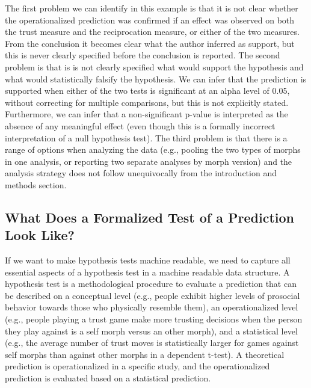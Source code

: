\documentclass[doc,floatsintext]{apa6}
\begin{document}
The first problem we can identify in this example is that it is not clear whether the operationalized prediction was confirmed if an effect was observed on both the trust measure and the reciprocation measure, or either of the two measures. From the conclusion it becomes clear what the author inferred as support, but this is never clearly specified before the conclusion is reported. The second problem is that is is not clearly specified what would support the hypothesis and what would statistically falsify the hypothesis. We can infer that the prediction is supported when either of the two tests is significant at an alpha level of 0.05, without correcting for multiple comparisons, but this is not explicitly stated. Furthermore, we can infer that a non-significant p-value is interpreted as the absence of any meaningful effect (even though this is a formally incorrect interpretation of a null hypothesis test). The third problem is that there is a range of options when analyzing the data (e.g., pooling the two types of morphs in one analysis, or reporting two separate analyses by morph version) and the analysis strategy does not follow unequivocally from the introduction and methods section.

\hypertarget{what-does-a-formalized-test-of-a-prediction-look-like}{%
\subsection{What Does a Formalized Test of a Prediction Look Like?}\label{what-does-a-formalized-test-of-a-prediction-look-like}}

If we want to make hypothesis tests machine readable, we need to capture all essential aspects of a hypothesis test in a machine readable data structure. A hypothesis test is a methodological procedure to evaluate a prediction that can be described on a conceptual level (e.g., people exhibit higher levels of prosocial behavior towards those who physically resemble them), an operationalized level (e.g., people playing a trust game make more trusting decisions when the person they play against is a self morph versus an other morph), and a statistical level (e.g., the average number of trust moves is statistically larger for games against self morphs than against other morphs in a dependent t-test). A theoretical prediction is operationalized in a specific study, and the operationalized prediction is evaluated based on a statistical prediction.
\end{document}

